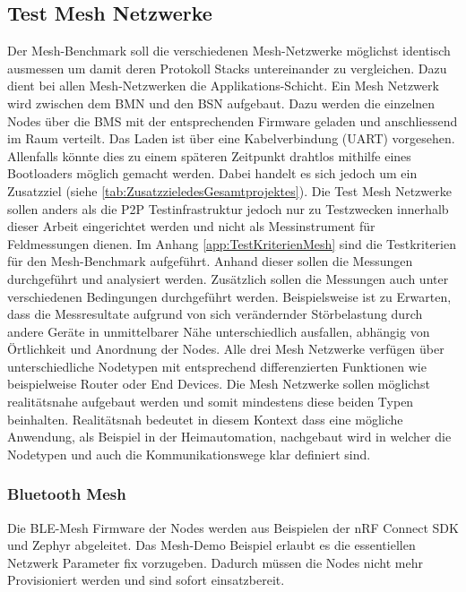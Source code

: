 \subsection{Test Mesh Netzwerke}\label{subsec:KonzeptTestMeshNetzwerke}

Der Mesh-Benchmark soll die verschiedenen Mesh-Netzwerke möglichst identisch ausmessen um damit deren Protokoll Stacks untereinander zu vergleichen. Dazu dient bei allen Mesh-Netzwerken die Applikations-Schicht. Ein Mesh Netzwerk wird zwischen dem BMN und den BSN aufgebaut. Dazu werden die einzelnen Nodes über die BMS mit der entsprechenden Firmware geladen und anschliessend im Raum verteilt. Das Laden ist über eine Kabelverbindung (UART) vorgesehen. Allenfalls könnte dies zu einem späteren Zeitpunkt drahtlos mithilfe eines Bootloaders möglich gemacht werden. Dabei handelt es sich jedoch um ein Zusatzziel (siehe \ref{tab:ZusatzzieledesGesamtprojektes}). Die Test Mesh Netzwerke sollen anders als die P2P Testinfrastruktur jedoch nur zu Testzwecken innerhalb dieser Arbeit eingerichtet werden und nicht als Messinstrument für Feldmessungen dienen.
Im Anhang \ref{app:TestKriterienMesh} sind die Testkriterien für den Mesh-Benchmark aufgeführt. Anhand dieser sollen die Messungen durchgeführt und analysiert werden. Zusätzlich sollen die Messungen auch unter verschiedenen Bedingungen durchgeführt werden. Beispielsweise ist zu Erwarten, dass die Messresultate aufgrund von sich verändernder Störbelastung durch andere Geräte in unmittelbarer Nähe unterschiedlich ausfallen, abhängig von Örtlichkeit und Anordnung der Nodes.
Alle drei Mesh Netzwerke verfügen über unterschiedliche Nodetypen mit entsprechend differenzierten Funktionen wie beispielweise Router oder End Devices. Die Mesh Netzwerke sollen möglichst realitätsnahe aufgebaut werden und somit mindestens diese beiden Typen beinhalten. Realitätsnah bedeutet in diesem Kontext dass eine mögliche Anwendung, als Beispiel in der Heimautomation, nachgebaut wird in welcher die Nodetypen und auch die Kommunikationswege klar definiert sind.

\subsubsection{Bluetooth Mesh}\label{subsubsection:Bluetooth Mesh}

Die BLE-Mesh Firmware der Nodes werden aus Beispielen der nRF Connect SDK und Zephyr abgeleitet. Das Mesh-Demo Beispiel erlaubt es die essentiellen Netzwerk Parameter fix vorzugeben. Dadurch müssen die Nodes nicht mehr Provisioniert werden und sind sofort einsatzbereit.


